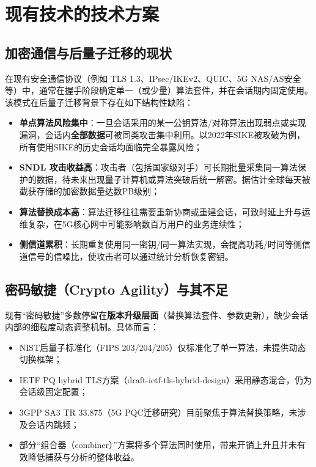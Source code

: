 \documentclass[12pt,a4paper]{article}
\begin{document}
\section{现有技术的技术方案}

\subsection{加密通信与后量子迁移的现状}

在现有安全通信协议（例如 TLS 1.3、IPsec/IKEv2、QUIC、5G NAS/AS安全等）中，通常在握手阶段确定单一（或少量）算法套件，并在会话期内固定使用。该模式在后量子迁移背景下存在如下结构性缺陷：

\begin{itemize}
    \item \textbf{单点算法风险集中}：一旦会话采用的某一公钥算法/对称算法出现弱点或实现漏洞，会话内\textbf{全部数据}可被同类攻击集中利用。以2022年SIKE被攻破为例，所有使用SIKE的历史会话均面临完全暴露风险；
    \item \textbf{SNDL 攻击收益高}：攻击者（包括国家级对手）可长期批量采集同一算法保护的数据，待未来出现量子计算机或算法突破后统一解密。据估计全球每天被截获存储的加密数据量达数PB级别；
    \item \textbf{算法替换成本高}：算法迁移往往需要重新协商或重建会话，可致时延上升与运维复杂，在5G核心网中可能影响数百万用户的业务连续性；
    \item \textbf{侧信道累积}：长期重复使用同一密钥/同一算法实现，会提高功耗/时间等侧信道信号的信噪比，使攻击者可以通过统计分析恢复密钥。
\end{itemize}

\subsection{密码敏捷（Crypto Agility）与其不足}

现有``密码敏捷''多数停留在\textbf{版本升级层面}（替换算法套件、参数更新），缺少会话内部的细粒度动态调整机制。具体而言：

\begin{itemize}
    \item NIST后量子标准化（FIPS 203/204/205）仅标准化了单一算法，未提供动态切换框架；
    \item IETF PQ hybrid TLS方案（draft-ietf-tls-hybrid-design）采用静态混合，仍为会话级固定配置；
    \item 3GPP SA3 TR 33.875（5G PQC迁移研究）目前聚焦于算法替换策略，未涉及会话内跳频；
    \item 部分``组合器（combiner）''方案将多个算法同时使用，带来开销上升且并未有效降低捕获与分析的整体收益。
\end{itemize}
\end{document}
